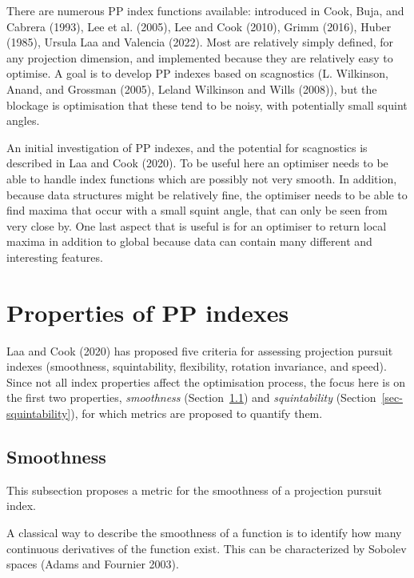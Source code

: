 \documentclass[
  12pt,
]{interact}
\theoremstyle{plain}
\begin{document}
There are numerous PP index functions available: introduced in Cook,
Buja, and Cabrera (1993), Lee et al. (2005), Lee and Cook (2010), Grimm
(2016), Huber (1985), Ursula Laa and Valencia (2022). Most are
relatively simply defined, for any projection dimension, and implemented
because they are relatively easy to optimise. A goal is to develop PP
indexes based on scagnostics (L. Wilkinson, Anand, and Grossman (2005),
Leland Wilkinson and Wills (2008)), but the blockage is optimisation
that these tend to be noisy, with potentially small squint angles.

An initial investigation of PP indexes, and the potential for
scagnostics is described in Laa and Cook (2020). To be useful here an
optimiser needs to be able to handle index functions which are possibly
not very smooth. In addition, because data structures might be
relatively fine, the optimiser needs to be able to find maxima that
occur with a small squint angle, that can only be seen from very close
by. One last aspect that is useful is for an optimiser to return local
maxima in addition to global because data can contain many different and
interesting features.

\hypertarget{sec-PP-properties}{%
\section{Properties of PP indexes}\label{sec-PP-properties}}

Laa and Cook (2020) has proposed five criteria for assessing projection
pursuit indexes (smoothness, squintability, flexibility, rotation
invariance, and speed). Since not all index properties affect the
optimisation process, the focus here is on the first two properties,
\emph{smoothness} (Section~\ref{sec-smoothness}) and
\emph{squintability} (Section~\ref{sec-squintability}), for which
metrics are proposed to quantify them.

\hypertarget{sec-smoothness}{%
\subsection{Smoothness}\label{sec-smoothness}}

This subsection proposes a metric for the smoothness of a projection
pursuit index.

A classical way to describe the smoothness of a function is to identify
how many continuous derivatives of the function exist. This can be
characterized by Sobolev spaces (Adams and Fournier 2003).
\end{document}
